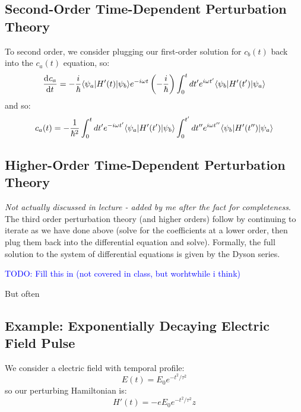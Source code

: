\subsection{Second-Order Time-Dependent Perturbation Theory}
To second order, we consider plugging our first-order solution for $c_b(t)$ back into the $c_a(t)$ equation, so:
\begin{equation}
    \dod{c_a}{t} = -\frac{i}{\hbar}\bra{\psi_a}H'(t)\ket{\psi_b}e^{-i\omega t}\left(-\frac{i}{\hbar}\right)\int_0^t dt' e^{i\omega t'}\bra{\psi_b}H'(t')\ket{\psi_a}
\end{equation}
and so:
\begin{equation}
    c_a(t) = -\frac{1}{\hbar^2}\int_0^t dt' e^{-i\omega t'}\langle \psi_a \rvert H'(t')\lvert \psi_b \rangle\int_0^{t'}dt'' e^{i\omega t''}\langle \psi_b \rvert H'(t'')\lvert \psi_a \rangle
\end{equation}

\subsection{Higher-Order Time-Dependent Perturbation Theory}

\emph{Not actually discussed in lecture - added by me after the fact for completeness}. The third order perturbation theory (and higher orders) follow by continuing to iterate as we have done above (solve for the coefficients at a lower order, then plug them back into the differential equation and solve). Formally, the full solution to the system of differential equations is given by the Dyson series. 
 

\textcolor{blue}{TODO: Fill this in (not covered in class, but worhtwhile i think)}

But often 

\subsection{Example: Exponentially Decaying Electric Field Pulse}
We consider a electric field with temporal profile:
\begin{equation}
    E(t) = E_0e^{-t^2/\tau^2}
\end{equation}
so our perturbing Hamiltonian is:
\begin{equation}
    H'(t) = -eE_0e^{-t^2/\tau^2}z
\end{equation}

